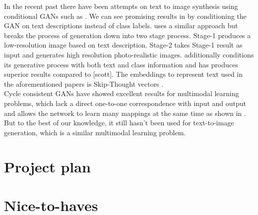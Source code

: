 \documentclass[]{article}
\begin{document}
In the recent past there have been attempts on text to image synthesis using conditional GANs such as \cite{reed2016generative}\cite{dash2017tac}\cite{zhang2017stackgan}\cite{DBLP:journals/corr/abs-1710-10916}. We can see promising results in \cite{reed2016generative} by conditioning the GAN on text descriptions instead of class labels. \cite{zhang2017stackgan} uses a similar approach but breaks the process of generation down into two stage process. Stage-1 produces a low-resolution image based on text description. Stage-2 takes Stage-1 result as input and generates high resolution photo-realistic images. \cite{dash2017tac} additionally conditions its generative process with both text and class information and has produces superior results compared to [scott]. The embeddings to represent text used in the aforementioned papers is Skip-Thought vectors \cite{kiros2015skip}.
\\

Cycle consistent GANs have showed excellent results for multimodal learning problems, which lack a direct one-to-one correspondence with input and output and allows the network to learn many mappings at the same time as shown in \cite{zhu2017unpaired}\cite{liu2017unsupervised}\cite{zhou2016learning}. But to the best of our knowledge, it still hasn't been used for text-to-image generation, which is a similar multimodal learning problem.
\\
\section{Project plan}

\section{Nice-to-haves}



\end{document}
